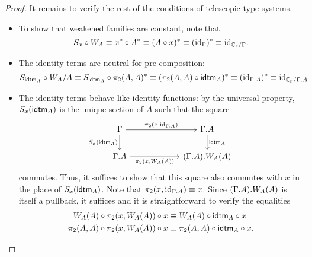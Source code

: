 \begin{proof}
It remains to verify the rest of the conditions of telescopic type systems.
\begin{itemize}
\item To show that weakened families are constant, note that
\begin{equation*}
S_x\circ W_A\equiv x^\ast\circ A^\ast\equiv (A\circ x)^\ast\equiv ({\mathrm{id}_{\Gamma}})^\ast\equiv {\mathrm{id}_{\mathbb{C}_{\mathbb{F}}/\Gamma}}.
\end{equation*}
\item The identity terms are neutral for pre-composition:
\begin{equation*}
S_{\tfid{A}}\circ W_A/A \jdeq S_{\tfid{A}}\circ \pi_2(A,A)^\ast \jdeq (\pi_2(A,A)\circ\tfid{A})^\ast \jdeq
(\catid{\ctxext{\Gamma}{A}})^\ast \jdeq \catid{\cat{C}_{\cat{F}}/\ctxext{\Gamma}{A}} 
\end{equation*}
\item The identity terms behave like identity functions: by the universal property,
$S_x(\tfid{A})$ is the unique section of $A$ such that the square
\begin{equation*}
\begin{tikzcd}[column sep=6em]
\Gamma \arrow[d,swap,"{S_x(\tfid{A})}"] \arrow[r,"{\pi_2(x,\catid{\ctxext{\Gamma}{A}})}"] & \ctxext{\Gamma}{A} \arrow[d,"{\tfid{A}}"] \\
\ctxext{\Gamma}{A} \arrow[r,swap,"{\pi_2(x,W_A(A))}"] & \ctxext{{\Gamma}{A}}{W_A(A)}
\end{tikzcd}
\end{equation*}
commutes. Thus, it suffices to show that this square also commutes with $x$ in the place of
$S_x(\tfid{A})$. Note that $\pi_2(x,\catid{\ctxext{\Gamma}{A}})\jdeq x$. 
Since $\ctxext{{\Gamma}{A}}{W_A(A)}$ is itself a pullback, it suffices
and it is straightforward to verify the equalities
\begin{align*}
W_A(A)\circ\pi_2(x,W_A(A))\circ x & \jdeq W_A(A)\circ\idtm{A}\circ x \\
\pi_2(A,A)\circ\pi_2(x,W_A(A))\circ x & \jdeq \pi_2(A,A)\circ\idtm{A}\circ x.\qedhere
\end{align*}
\end{itemize}
\end{proof}



\begin{comment}
We then demonstrate how to define a category internal to a telescopic type system. The main
point of this lies mainly in demonstrating how the operations of telescopic type systems can
be used to define a category, because it is no surprise that a category can be
defined in type theory. Nevertheless, it is noteworthy that we need no further 
conditions on telescopic type systems.
This is unlike the situation in category theory, where we need
to assume that the ambient category has finite limits in order to say what an
internal category is. In fact, it is possible to define a telescopic type system internal
to a telescopic type system, just using the algebraic structure of a telescopic type system, and actually
defining an internal category was the hardest part of that definition.
\end{comment}

